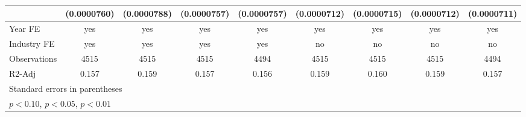\begin{table}[htbp]
\begin{tabular}{l*{8}{c}}
                    & (0.0000760)         & (0.0000788)         & (0.0000757)         & (0.0000757)         & (0.0000712)         & (0.0000715)         & (0.0000712)         & (0.0000711)         \\
\hline
Year FE             &         yes         &         yes         &         yes         &         yes         &         yes         &         yes         &         yes         &         yes         \\
Industry FE         &         yes         &         yes         &         yes         &         yes         &          no         &          no         &          no         &          no         \\
Observations        &        4515         &        4515         &        4515         &        4494         &        4515         &        4515         &        4515         &        4494         \\
R2-Adj              &       0.157         &       0.159         &       0.157         &       0.156         &       0.159         &       0.160         &       0.159         &       0.157         \\
\hline\hline
\multicolumn{9}{l}{\footnotesize Standard errors in parentheses}\\
\multicolumn{9}{l}{\footnotesize \sym{*} \(p<0.10\), \sym{**} \(p<0.05\), \sym{***} \(p<0.01\)}\\
\end{tabular}
\end{table}
